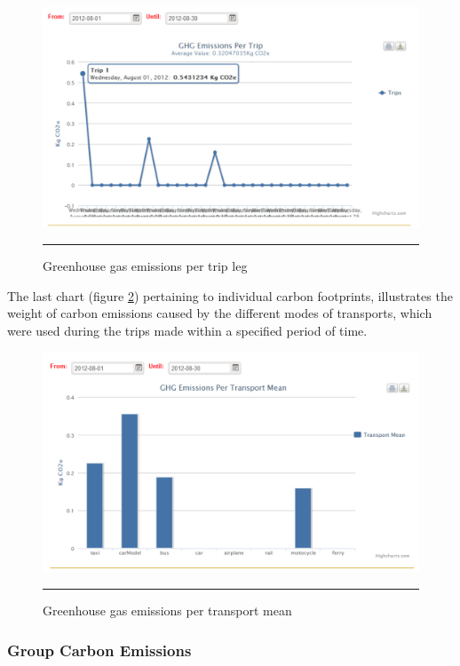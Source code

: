 \begin{figure}[htbp]
	\centering
		\includegraphics[scale=0.60]{./Figures/chapter4/figure20.pdf}
		\rule{35em}{0.5pt}
	\caption[Greenhouse gas emissions per trip leg]{Greenhouse gas emissions per trip leg}
	\label{fig:ghgPerTrip}
\end{figure}

The last chart (figure \ref{fig:ghgPerTransportMean}) pertaining to individual carbon footprints, illustrates the weight of carbon emissions caused by the different modes of transports, which were used during the trips made within a specified period of time.


\begin{figure}[htbp]
	\centering
		\includegraphics[scale=0.60]{./Figures/chapter4/figure21.pdf}
		\rule{35em}{0.5pt}
	\caption[Greenhouse gas emissions per transport mean]{Greenhouse gas emissions per transport mean}
	\label{fig:ghgPerTransportMean}
\end{figure}

\subsubsection{Group Carbon Emissions}

